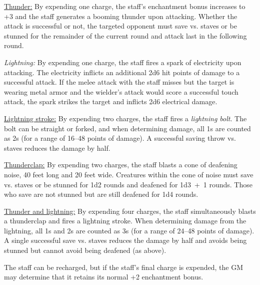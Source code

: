 \begin{multicols}{2}
\underline{Thunder:} By expending one charge, the staff's enchantment bonus increases to +3 and the staff generates a booming thunder upon attacking.  Whether the attack is successful or not, the targeted opponent must save vs. staves or be stunned for the remainder of the current round and attack last in the following round.  

\textit{Lightning:} By expending one charge, the staff fires a spark of electricity upon attacking.  The electricity inflicts an additional 2d6 hit points of damage to a successful attack.  If the melee attack with the staff misses but the target is wearing metal armor and the wielder's attack would score a successful touch attack, the spark strikes the target and inflicts 2d6 electrical damage.

\underline{Lightning stroke:} By expending two charges, the staff fires a \textit{lightning bolt}.  The bolt can be straight or forked, and when determining damage, all 1s are counted as 2s (for a range of 16--48 points of damage).  A successful saving throw vs. staves reduces the damage by half.

\underline{Thunderclap:} By expending two charges, the staff blasts a cone of deafening noise, 40 feet long and 20 feet wide.  Creatures within the cone of noise must save vs. staves or be stunned for 1d2 rounds and deafened for 1d3~+~1 rounds. Those who save are not stunned but are still deafened for 1d4 rounds.

\underline{Thunder and lightning:} By expending four charges, the staff simultaneously blasts a thunderclap and fires a lightning stroke.  When determining damage from the lightning, all 1s and 2s are counted as 3s (for a range of 24--48 points of damage).  A single successful save vs. staves reduces the damage by half and avoids being stunned but cannot avoid being deafened (as above).

The staff can be recharged, but if the staff's final charge is expended, the GM may determine that it retains its normal +2 enchantment bonus.


\end{multicols}
